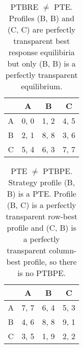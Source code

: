 \begin{table}
	\caption{
		PTBRE $\ne$ PTE.
		Profiles (B, B) and (C, C) are perfectly transparent best response equilibiria but only (B, B) is a perfectly transparent equilibrium.
	}
	\label{tab:ptbre-ne-pte}
	\centering
	\begin{tabular}{|c|c|c|c|}
		\hline
			& A		& B	   & C	  \\
		\hline
		A 		&\cellcolor{gray!70} 0, 0 &\cellcolor{gray!70} 1, 2 &\cellcolor{gray!70} 4, 5 \\
		\hline
		B		&\cellcolor{gray!70} 2, 1 &\cellcolor{gray!00} 8, 8 &\cellcolor{gray!70} 3, 6 \\
		\hline
		C		&\cellcolor{gray!70} 5, 4 &\cellcolor{gray!70} 6, 3 &\cellcolor{gray!20} 7, 7 \\
		\hline
	\end{tabular}
\end{table}

\begin{table}
	\caption{
		PTE $\ne$ PTBPE.
		Strategy profile (B, B) is a PTE.
		Profile (B, C) is a perfectly transparent row-best profile and (C, B) is a perfectly transparent column-best profile, so there is no PTBPE.
	}
	\label{tab:pte-ne-ptbpe}
	\centering
	\begin{tabular}{|c|c|c|c|}
		\hline
			& A		& B	   & C	  \\
		\hline
		A 		&\cellcolor{gray!20} 7, 7 &\cellcolor{gray!70} 6, 4 &\cellcolor{gray!70} 5, 3 \\
		\hline
		B		&\cellcolor{gray!70} 4, 6 &\cellcolor{gray!00} 8, 8 &\cellcolor{gray!70} 9, 1 \\
		\hline
		C		&\cellcolor{gray!70} 3, 5 &\cellcolor{gray!70} 1, 9 &\cellcolor{gray!70} 2, 2 \\
		\hline
	\end{tabular}
\end{table}

